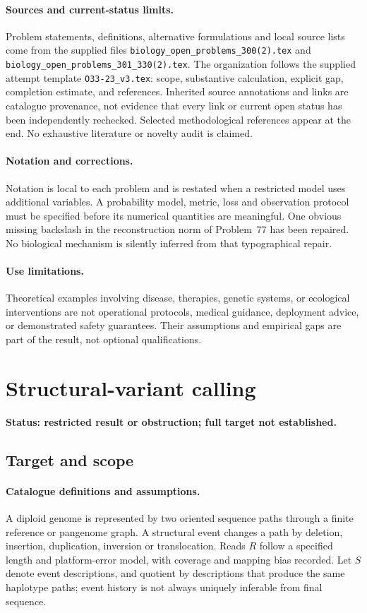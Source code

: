 \documentclass[11pt]{article}
\begin{document}
\paragraph{Sources and current-status limits.}
Problem statements, definitions, alternative formulations and local source lists
come from the supplied files
\texttt{biology\_open\_problems\_300(2).tex} and
\texttt{biology\_open\_problems\_301\_330(2).tex}.
The organization follows the supplied attempt template
\texttt{O33-23\_v3.tex}: scope, substantive calculation, explicit gap,
completion estimate, and references. Inherited source annotations and links are
catalogue provenance, not evidence that every link or current open status has
been independently rechecked. Selected methodological references appear at the
end. No exhaustive literature or novelty audit is claimed.

\paragraph{Notation and corrections.}
Notation is local to each problem and is restated when a restricted model uses
additional variables. A probability model, metric, loss and observation protocol
must be specified before its numerical quantities are meaningful. One obvious
missing backslash in the reconstruction norm of Problem~77 has been repaired.
No biological mechanism is silently inferred from that typographical repair.

\paragraph{Use limitations.}
Theoretical examples involving disease, therapies, genetic systems, or ecological
interventions are not operational protocols, medical guidance, deployment advice,
or demonstrated safety guarantees. Their assumptions and empirical gaps are part
of the result, not optional qualifications.


\section*{Structural-variant calling}
\label{prob:064}
\noindent\textbf{Status: restricted result or obstruction; full target not established.}
\subsection{Target and scope}
\paragraph{Catalogue definitions and assumptions.}
A diploid genome is represented by two oriented sequence paths through a finite reference or pangenome graph. A structural event changes a path by deletion, insertion, duplication, inversion or translocation. Reads $R$ follow a specified length and platform-error model, with coverage and mapping bias recorded. Let $S$ denote event descriptions, and quotient by descriptions that produce the same haplotype paths; event history is not always uniquely inferable from final sequence.
\end{document}

